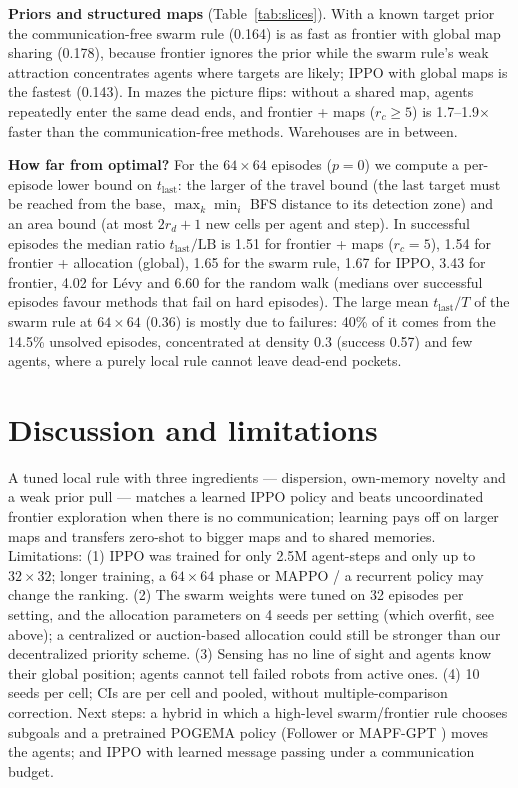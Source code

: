\documentclass[10pt]{article}
\begin{document}
\textbf{Priors and structured maps} (Table~\ref{tab:slices}). With a known target prior the communication-free swarm
rule (0.164) is as fast as frontier with global map sharing (0.178), because frontier ignores the prior while the swarm
rule's weak attraction concentrates agents where targets are likely; IPPO with global maps is the fastest (0.143).
In mazes the picture flips: without a shared map, agents repeatedly enter the same dead ends, and frontier + maps
($r_c\ge5$) is 1.7--1.9$\times$ faster than the communication-free methods. Warehouses are in between.

\textbf{How far from optimal?} For the $64\times64$ episodes ($p=0$) we compute a per-episode lower bound on
$t_{\text{last}}$: the larger of the travel bound (the last target must be reached from the base,
$\max_k\min_i$ BFS distance to its detection zone) and an area bound (at most $2r_d+1$ new cells per agent and
step). In successful episodes the median ratio $t_{\text{last}}/\text{LB}$ is 1.51 for frontier + maps ($r_c=5$),
1.54 for frontier + allocation (global), 1.65 for the swarm rule, 1.67 for IPPO, 3.43 for frontier, 4.02 for
L\'evy and 6.60 for the random walk (medians over successful episodes favour methods that fail on hard episodes).
The large mean $t_{\text{last}}/T$ of the swarm rule at $64\times64$ (0.36) is mostly due to failures: 40\% of it comes
from the 14.5\% unsolved episodes, concentrated at density 0.3 (success 0.57) and few agents, where a purely
local rule cannot leave dead-end pockets.

\section{Discussion and limitations}
A tuned local rule with three ingredients --- dispersion, own-memory novelty and a weak prior pull --- matches a learned
IPPO policy and beats uncoordinated frontier exploration when there is no communication; learning pays off on larger
maps and transfers zero-shot to bigger maps and to shared memories. Limitations: (1) IPPO was trained for only 2.5M
agent-steps and only up to $32\times32$; longer training, a $64\times64$ phase or MAPPO / a recurrent policy may change
the ranking. (2) The swarm weights were tuned on 32 episodes per setting, and the allocation parameters on 4 seeds per setting
(which overfit, see above); a centralized or auction-based allocation could still be stronger than our
decentralized priority scheme.
(3) Sensing has no line of sight and agents know their global position; agents cannot tell failed robots from active
ones. (4) 10 seeds per cell; CIs are per cell and pooled, without multiple-comparison correction.
Next steps: a hybrid in which a high-level swarm/frontier rule chooses subgoals and a pretrained POGEMA policy
(Follower \cite{skrynnik2024follower} or MAPF-GPT \cite{andreychuk2025mapfgpt}) moves the agents; and IPPO with
learned message passing under a communication budget.
\end{document}
